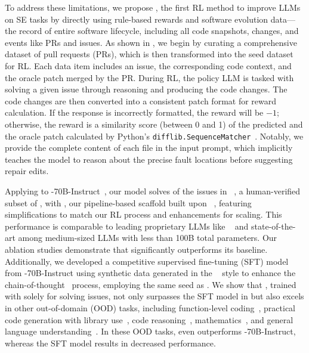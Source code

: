 To address these limitations, we propose \tech, the first RL method to improve LLMs on SE tasks by directly using rule-based rewards and software evolution data---the record of entire software lifecycle, including all code snapshots, changes, and events like PRs and issues.
As shown in , we begin by curating a comprehensive dataset of \github pull requests (PRs), which is then transformed into the seed dataset for RL.
Each data item includes an issue, the corresponding code context, and the oracle patch merged by the PR.
During RL, the policy LLM is tasked with solving a given issue through reasoning and producing the code changes.
The code changes are then converted into a consistent patch format for reward calculation.
If the response is incorrectly formatted, the reward will be $-1$; otherwise, the reward is a similarity score (between 0 and 1) of the predicted and the oracle patch calculated by Python's \verb|difflib.SequenceMatcher|~\cite{Gestalt_pattern_matching}.
Notably, we provide the complete content of each file in the input prompt, which implicitly teaches the model to reason about the precise fault locations before suggesting repair edits.






Applying \tech to -70B-Instruct~\cite{llama31}, our model \ours[70] solves \textbf{\swebfinalbig{\%}} of the issues in \swebverified~\cite{swebverified}, a human-verified subset of \swebench, with \ouragentless, our pipeline-based scaffold built upon \agentless~\cite{agentless}, featuring simplifications to match our RL process and enhancements for scaling.
This performance is comparable to leading proprietary LLMs like ~\cite{gpt4o} and state-of-the-art among medium-sized LLMs with less than 100B total parameters.
Our ablation studies demonstrate that \ours[70] significantly outperforms its \llama baseline. Additionally, we developed a competitive supervised fine-tuning (SFT) model from -70B-Instruct using synthetic data generated in the \magicoder~\cite{magicoder} style to enhance the chain-of-thought~\cite{cot} process, employing the same seed as \tech.
We show that \ours[70], trained with \tech solely for solving issues, not only surpasses the SFT model in \swebench but also excels in other out-of-domain (OOD) tasks, including function-level coding~\cite{codex,liu2023code}, practical code generation with library use~\cite{bigcodebench}, code reasoning~\cite{cruxeval}, mathematics~\cite{mathbench}, and general language understanding~\cite{mmlu}.
In these OOD tasks, \ours[70] even outperforms -70B-Instruct, whereas the SFT model results in decreased performance.


